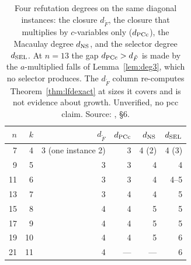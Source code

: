 \begin{table}[t]
\centering\small
\begin{tabular}{@{}rrrrrr@{}}
\toprule
$n$ & $k$ & $d_{\tilde F}$ & $d_{\rm PCc}$ & $d_{\rm NS}$ & $d_{\rm SEL}$ \\
\midrule
7 & 4 & 3 (one instance 2) & 3 & 4 (2) & 4 (3) \\
9 & 5 & 3 & 3 & 4 & 4 \\
11 & 6 & 3 & 3 & 4 & 4--5 \\
13 & 7 & 3 & 4 & 4 & 5 \\
15 & 8 & 4 & 4 & 5 & 5 \\
17 & 9 & 4 & 4 & 5 & 5 \\
19 & 10 & 4 & 4 & 5 & 6 \\
21 & 11 & 4 & --- & --- & 6 \\
\bottomrule
\end{tabular}
\caption[]{Four refutation degrees on the same diagonal instances:
the closure $d_{\tilde F}$, the closure that multiplies by $c$-variables
only ($d_{\rm PCc}$), the Macaulay degree $d_{\rm NS}$, and the selector
degree $d_{\rm SEL}$. At $n=13$ the gap $d_{\rm PCc}>d_{\tilde F}$ is made
by the $a$-multiplied falls of Lemma~\ref{lem:deg3}, which no selector
produces. The $d_{\tilde F}$ column re-computes
Theorem~\ref{thm:lfdexact} at sizes it covers and is not evidence about
growth. Unverified, no pcc claim. Source:
, \S6.}
\label{tab:fd-selector-gap}
\end{table}

